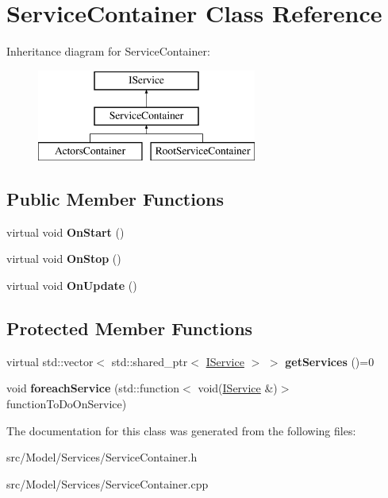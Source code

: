 \hypertarget{classServiceContainer}{}\section{Service\+Container Class Reference}
\label{classServiceContainer}
Inheritance diagram for Service\+Container\+:\begin{figure}[H]
\begin{center}
\leavevmode
\includegraphics[height=3.000000cm]{classServiceContainer}
\end{center}
\end{figure}
\subsection*{Public Member Functions}
\begin{DoxyCompactItemize}
\item 
virtual void {\bfseries On\+Start} ()\hypertarget{classServiceContainer_a7c194f5f4b22ad879b720d3ae04cc5d7}{}\label{classServiceContainer_a7c194f5f4b22ad879b720d3ae04cc5d7}

\item 
virtual void {\bfseries On\+Stop} ()\hypertarget{classServiceContainer_aa27df2b2b93b5e4c3398d64a7c8dbef8}{}\label{classServiceContainer_aa27df2b2b93b5e4c3398d64a7c8dbef8}

\item 
virtual void {\bfseries On\+Update} ()\hypertarget{classServiceContainer_a6ca7093743c7cb016bbdac9132391eb8}{}\label{classServiceContainer_a6ca7093743c7cb016bbdac9132391eb8}

\end{DoxyCompactItemize}
\subsection*{Protected Member Functions}
\begin{DoxyCompactItemize}
\item 
virtual std\+::vector$<$ std\+::shared\+\_\+ptr$<$ \hyperlink{classIService}{I\+Service} $>$ $>$ {\bfseries get\+Services} ()=0\hypertarget{classServiceContainer_a8e94080936839e48ea15e81a13d87ad1}{}\label{classServiceContainer_a8e94080936839e48ea15e81a13d87ad1}

\item 
void {\bfseries foreach\+Service} (std\+::function$<$ void(\hyperlink{classIService}{I\+Service} \&)$>$ function\+To\+Do\+On\+Service)\hypertarget{classServiceContainer_aea6112cb572e33a42d5bd8c510bbaea7}{}\label{classServiceContainer_aea6112cb572e33a42d5bd8c510bbaea7}

\end{DoxyCompactItemize}


The documentation for this class was generated from the following files\+:\begin{DoxyCompactItemize}
\item 
src/\+Model/\+Services/Service\+Container.\+h\item 
src/\+Model/\+Services/Service\+Container.\+cpp\end{DoxyCompactItemize}
